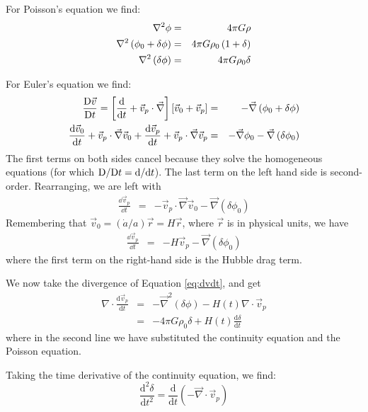 \begin{enumerate}
\begin{answer}
For Poisson's equation we find:
\begin{eqnarray}
\nabla^2\phi &=& 4\pi G \rho  \cr
\nabla^2\left(\phi_0 + \delta\phi\right) &=& 4\pi
G \rho_0\left(1+\delta\right)  \cr
\nabla^2\left(\delta\phi\right) &=& 4\pi G \rho_0 \delta
\end{eqnarray}

For Euler's equation we find:
\begin{eqnarray}
\frac{{\rm D}\vec{v}}{{\rm D} t} =
\left[ \frac{{\rm d}}{{\rm d}t} + \vec{v}_p \cdot \vec{\nabla} \right]
\left[\vec{v}_0 + \vec{v}_p\right] &=& - \vec{\nabla}\left(\phi_0
+ \delta\phi\right) \cr
\frac{{\rm d}\vec{v}_0}{{\rm d}t} + \vec{v}_p \cdot \vec{\nabla}\vec{v}_0
+ \frac{{\rm d}\vec{v}_p}{{\rm d}t} + \vec{v}_p \cdot \vec{\nabla}\vec{v}_p
&=& - \vec{\nabla}\phi_0 - \vec{\nabla}\left(\delta\phi_0\right)
\end{eqnarray}
The first terms on both sides cancel because they solve the
homogeneous equations (for which ${\rm D}/{\rm D}t
= {\rm d}/{\rm d}t$). The last term on the left hand side is
second-order. Rearranging, we are left with
\begin{eqnarray}
\frac{\dd{\vec{v}_p}}{\dd{t}}
&=& - \vec{v}_p \cdot \vec{\nabla}\vec{v}_0
- \vec{\nabla}\left(\delta\phi_0\right)
\end{eqnarray}
Remembering that $\vec{v}_0 = ({\dot a}/a)\vec{r} = H\vec{r}$, where
$\vec{r}$ is in physical units, we have
\begin{eqnarray}
\label{eq:dvdt}
\frac{\dd{\vec{v}_p}}{\dd{t}}
&=&
- H \vec{v}_p
- \vec{\nabla}\left(\delta\phi_0\right)
\end{eqnarray}
where the first term on the right-hand side is the Hubble drag term.

We now take the divergence of Equation \ref{eq:dvdt}, and get
\begin{eqnarray}
\nabla \cdot \frac{\mathrm{d}\vec{v}_p}{\mathrm{d} t} &=& -\vec{\nabla}^2(\delta\phi) - H(t)\nabla \cdot \vec{v}_p \\  
 &=& -4\pi G \rho_0 \delta + H(t) \frac{\mathrm{d}\delta}{\mathrm{d} t}  \label{eq:4piG}
\end{eqnarray}
where in the second line we have substituted the continuity equation
and the Poisson equation.

Taking the time derivative of the continuity equation, we find:
\begin{equation}
\frac{\mathrm{d}^2\delta}{\mathrm{d} t^2}
= \frac{\mathrm{d}}{\mathrm{d}
t}\left(-\vec{\nabla} \cdot \vec{v}_p\right) \label{eq:d2delta}
\end{equation}


\end{answer}
\end{enumerate}
